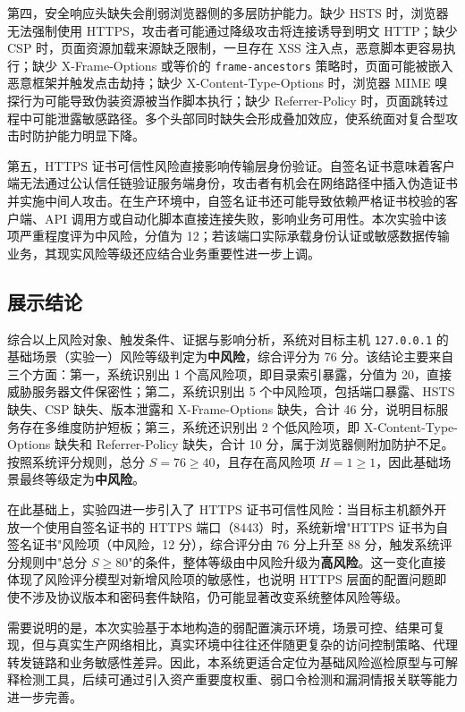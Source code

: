 \documentclass[12pt,a4paper,fontset=none]{ctexart}
\begin{document}
第四，安全响应头缺失会削弱浏览器侧的多层防护能力。缺少 HSTS 时，浏览器无法强制使用 HTTPS，攻击者可能通过降级攻击将连接诱导到明文 HTTP；缺少 CSP 时，页面资源加载来源缺乏限制，一旦存在 XSS 注入点，恶意脚本更容易执行；缺少 X-Frame-Options 或等价的 \texttt{frame-ancestors} 策略时，页面可能被嵌入恶意框架并触发点击劫持；缺少 X-Content-Type-Options 时，浏览器 MIME 嗅探行为可能导致伪装资源被当作脚本执行；缺少 Referrer-Policy 时，页面跳转过程中可能泄露敏感路径。多个头部同时缺失会形成叠加效应，使系统面对复合型攻击时防护能力明显下降。

第五，HTTPS 证书可信性风险直接影响传输层身份验证。自签名证书意味着客户端无法通过公认信任链验证服务端身份，攻击者有机会在网络路径中插入伪造证书并实施中间人攻击。在生产环境中，自签名证书还可能导致依赖严格证书校验的客户端、API 调用方或自动化脚本直接连接失败，影响业务可用性。本次实验中该项严重程度评为中风险，分值为 12；若该端口实际承载身份认证或敏感数据传输业务，其现实风险等级还应结合业务重要性进一步上调。

\subsection{展示结论}

综合以上风险对象、触发条件、证据与影响分析，系统对目标主机 \texttt{127.0.0.1} 的基础场景（实验一）风险等级判定为\textbf{中风险}，综合评分为 76 分。该结论主要来自三个方面：第一，系统识别出 1 个高风险项，即目录索引暴露，分值为 20，直接威胁服务器文件保密性；第二，系统识别出 5 个中风险项，包括端口暴露、HSTS 缺失、CSP 缺失、版本泄露和 X-Frame-Options 缺失，合计 46 分，说明目标服务存在多维度防护短板；第三，系统还识别出 2 个低风险项，即 X-Content-Type-Options 缺失和 Referrer-Policy 缺失，合计 10 分，属于浏览器侧附加防护不足。按照系统评分规则，总分 $S = 76 \geq 40$，且存在高风险项 $H = 1 \geq 1$，因此基础场景最终等级定为\textbf{中风险}。

在此基础上，实验四进一步引入了 HTTPS 证书可信性风险：当目标主机额外开放一个使用自签名证书的 HTTPS 端口（8443）时，系统新增"HTTPS 证书为自签名证书"风险项（中风险，12 分），综合评分由 76 分上升至 88 分，触发系统评分规则中"总分 $S \geq 80$"的条件，整体等级由中风险升级为\textbf{高风险}。这一变化直接体现了风险评分模型对新增风险项的敏感性，也说明 HTTPS 层面的配置问题即使不涉及协议版本和密码套件缺陷，仍可能显著改变系统整体风险等级。

需要说明的是，本次实验基于本地构造的弱配置演示环境，场景可控、结果可复现，但与真实生产网络相比，真实环境中往往还伴随更复杂的访问控制策略、代理转发链路和业务敏感性差异。因此，本系统更适合定位为基础风险巡检原型与可解释检测工具，后续可通过引入资产重要度权重、弱口令检测和漏洞情报关联等能力进一步完善。
\end{document}
